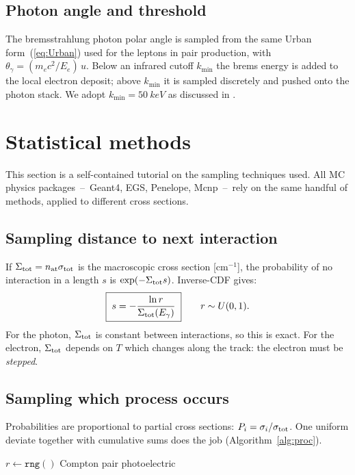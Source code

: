 \documentclass[11pt,a4paper]{article}
\newcommand{\Eg}{E_\gamma}
\newcommand{\me}{m_e c^2}
\newcommand{\kmin}{k_{\min}}
\begin{document}
\subsection{Photon angle and threshold}

The bremsstrahlung photon polar angle is sampled from the same
Urban form~(\ref{eq:Urban}) used for the leptons in pair
production, with $\theta_\gamma=(\me/E_e)\,u$. Below an
infrared cutoff $\kmin$ the brems energy is added to the local
electron deposit; above $\kmin$ it is sampled discretely and
pushed onto the photon stack. We adopt $\kmin=\SI{50}{keV}$ as
discussed in .

\section{Statistical methods}\label{sec:stats}

This section is a self-contained tutorial on the sampling
techniques used. All MC physics packages~--~{\sc Geant4},
{\sc EGS}, {\sc Penelope}, {\sc Mcnp}~--~rely on the same handful
of methods, applied to different cross sections.

\subsection{Sampling distance to next interaction}

If $\Sigma_{\rm tot}=n_{\rm at}\sigma_{\rm tot}$ is the macroscopic
cross section [cm$^{-1}$], the probability of no interaction in a
length $s$ is $\exp(-\Sigma_{\rm tot} s)$. Inverse-CDF gives:
\begin{equation}
\boxed{\;
  s = -\frac{\ln r}{\Sigma_{\rm tot}(\Eg)}
\;}
\qquad r\sim U(0,1).
\end{equation}
For the photon, $\Sigma_{\rm tot}$ is constant between
interactions, so this is exact. For the electron, $\Sigma_{\rm tot}$
depends on $T$ which changes along the track: the electron must
be \emph{stepped}.

\subsection{Sampling which process occurs}

Probabilities are proportional to partial cross sections:
\(P_i = \sigma_i/\sigma_{\rm tot}\). One uniform deviate together
with cumulative sums does the job (Algorithm~\ref{alg:proc}).

\begin{algorithm}
\caption{Sample which photon process occurs.}
\label{alg:proc}
\begin{algorithmic}[1]
  \State $r \gets \texttt{rng}()$
   \State \Return Compton
   \State \Return pair
  \Else \State \Return photoelectric
  \EndIf
\end{algorithmic}
\end{algorithm}
\end{document}
